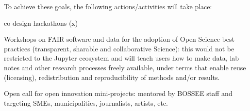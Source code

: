 \begin{task}[
  title=Training Workshops and community building,
  id=workshops,
  lead=UIO,
  PM=36,
  wphases={0-48},
  partners={UIO,SRL,XFEL,QS,CDS,WTT,SIL,UPSUD,INSERM}
]
\begin{compactitem}
  \end{compactitem}
 

To achieve these goals, the following actions/activities will take place:

 

  \begin{compactitem}
   \item co-design hackathons (x)

   \item Workshops on FAIR software and data for the adoption of Open Science best practices (transparent, sharable and collaborative Science): this would not be restricted to the Jupyter ecosystem and will teach users how to make data, lab notes and other research processes freely available, under terms that enable reuse (licensing), redistribution and reproducibility of methods and/or results.

   \item Open call for open innovation mini-projects: mentored by BOSSEE staff and targeting SMEs, municipalities, journalists, artists, etc.

  \end{compactitem}
 
\end{task}
